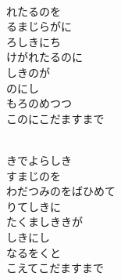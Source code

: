 \documentclass[10pt,b5j]{tarticle} %
\begin{document}
\vspace{1.5em} %
\newcommand{\linespace}{0.5em} %
\newcommand{\blocksize}{0.5\hsize} %
\newcommand{\itemmargin}{6em} %
\begin{enumerate} %
    \setlength{\itemindent}{\itemmargin} %
    \begin{minipage}[c]{\blocksize}
    
        \vspace{\linespace}
        \item~\\
        れたるのを\\
        るまじらがに\\
        ろしきにち\\
        けがれたるのに\\
        しきのが\\
        のにし\\
        もろのめつつ\\
        このにこだますまで
        
        \vspace{\linespace}
        \item~\\
        きでよらしき\\
        すまじのを\\
        わだつみのをばひめて\\
        りてしきに\\
        たくましききが\\
        しきにし\\
        なるをくと\\
        こえてこだますまで
    
    \end{minipage}
\end{enumerate} %
\end{document}

